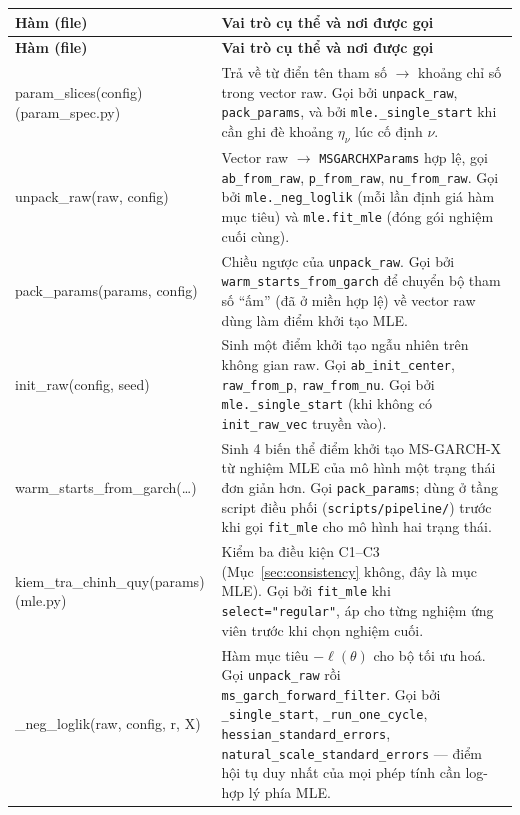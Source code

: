 \documentclass[11pt,a4paper]{article}
\newcommand{\code}[1]{\texttt{#1}}
\newcommand{\file}[1]{\texttt{#1}}
\begin{document}
\begin{longtable}{@{}>{\ttfamily\scriptsize\raggedright\arraybackslash}p{5.0cm} >{\raggedright\arraybackslash}p{9.5cm}@{}}
\toprule
\textbf{\normalfont Hàm (file)} & \textbf{Vai trò cụ thể và nơi được gọi} \\
\midrule
\endfirsthead
\toprule
\textbf{\normalfont Hàm (file)} & \textbf{Vai trò cụ thể và nơi được gọi} \\
\midrule
\endhead
\bottomrule
\endfoot
param\_slices(config) \newline \footnotesize{(param\_spec.py)} & Trả về từ điển tên tham số $\to$ khoảng chỉ số trong vector raw. Gọi bởi \code{unpack\_raw}, \code{pack\_params}, và bởi \code{mle.\_single\_start} khi cần ghi đè khoảng $\eta_\nu$ lúc cố định $\nu$. \\
unpack\_raw(raw, config) & Vector raw $\to$ \code{MSGARCHXParams} hợp lệ, gọi \code{ab\_from\_raw}, \code{p\_from\_raw}, \code{nu\_from\_raw}. Gọi bởi \code{mle.\_neg\_loglik} (mỗi lần định giá hàm mục tiêu) và \code{mle.fit\_mle} (đóng gói nghiệm cuối cùng). \\
pack\_params(params, config) & Chiều ngược của \code{unpack\_raw}. Gọi bởi \code{warm\_starts\_from\_garch} để chuyển bộ tham số ``ấm'' (đã ở miền hợp lệ) về vector raw dùng làm điểm khởi tạo MLE. \\
init\_raw(config, seed) & Sinh một điểm khởi tạo ngẫu nhiên trên không gian raw. Gọi \code{ab\_init\_center}, \code{raw\_from\_p}, \code{raw\_from\_nu}. Gọi bởi \code{mle.\_single\_start} (khi không có \code{init\_raw\_vec} truyền vào). \\
warm\_starts\_from\_garch(\ldots) & Sinh 4 biến thể điểm khởi tạo MS-GARCH-X từ nghiệm MLE của mô hình một trạng thái đơn giản hơn. Gọi \code{pack\_params}; dùng ở tầng script điều phối (\file{scripts/pipeline/}) trước khi gọi \code{fit\_mle} cho mô hình hai trạng thái. \\
kiem\_tra\_chinh\_quy(params) \newline \footnotesize{(mle.py)} & Kiểm ba điều kiện C1--C3 (Mục~\ref{sec:consistency} không, đây là mục MLE). Gọi bởi \code{fit\_mle} khi \code{select="regular"}, áp cho từng nghiệm ứng viên trước khi chọn nghiệm cuối. \\
\_neg\_loglik(raw, config, r, X) & Hàm mục tiêu $-\ell(\theta)$ cho bộ tối ưu hoá. Gọi \code{unpack\_raw} rồi \code{ms\_garch\_forward\_filter}. Gọi bởi \code{\_single\_start}, \code{\_run\_one\_cycle}, \code{hessian\_standard\_errors}, \code{natural\_scale\_standard\_errors} --- điểm hội tụ duy nhất của mọi phép tính cần log-hợp lý phía MLE. \\

\end{longtable}
\end{document}
